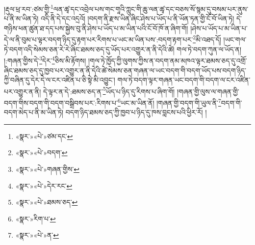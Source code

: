 །རྡུལ་ཕྲ་རབ་:ཙམ་གྱི་\footnote{«སྣར་»«པེ་»ཙམ་དང་}ལན་ཚྭ་དང་འབྲེལ་པས་གང་གཱའི་ཀླུང་གི་ཆུ་ལན་ཚྭ་དང་བཅས་སོ་སྙམ་དུ་བསམ་པར་ནུས་པ་ནི་མ་ཡིན་ཏེ། འདི་ནི་དེ་དང་འདྲའོ། །བདག་ནི་རྫས་ཡིན་ཞིང་ཤེས་པ་ཡོད་པ་ནི་ཡོན་ཏན་གྱི་ངོ་བོ་ཡིན་ཏེ། དེ་གཉིས་ཕན་ཚུན་ཐ་དད་པས་སྐྱེས་བུ་ནི་ཤེས་པ་ཡོད་པ་མ་ཡིན་པའི་ངོ་བོ་ཁོ་ན་ཞིག་གོ། །ཤེས་པ་ཡོད་པ་མ་ཡིན་པ་དེ་ལ་ནི་བུམ་པ་ལྟར་བདག་ཉིད་དུ་རྟག་པར་རིགས་པ་ཡང་མ་ཡིན་པས་:བདག་རྟག་པར་\footnote{«སྣར་»«པེ་»བདག་}མི་འཐད་དོ། །ཡང་གལ་ཏེ་བདག་འདི་སེམས་ཅན་རེ་རེ་ཞིང་ཐམས་ཅད་དུ་ཡོད་པར་འགྱུར་ན་ནི་དེའི་ཚེ། གལ་ཏེ་བདག་ཀུན་ལ་ཡོད་ན། །:གཞན་གྱིས་དེ་\footnote{«སྣར་»«པེ་»གཞན་གྱིས་}དེར་\footnote{«སྣར་»«པེ་»དེར་རང་}ཅིས་མི་རྟོགས། །གལ་ཏེ་ཁྱོད་ཀྱི་ལུགས་ཀྱིས་ན་བདག་ནམ་མཁའ་ལྟར་ཐམས་ཅད་དུ་འགྲོ་ཞིང་ཐམས་ཅད་དུ་ཁྱབ་པར་འགྱུར་ན་ནི་དེའི་ཚེ་སེམས་ཅན་གཞན་ལ་ཡང་བདག་གི་བདག་ཡོད་པས་བདག་ཉིད་ཀྱི་བཞིན་དུ་དེར་དེ་ལ་ངར་འཛིན་པ་ཅི་སྟེ་མི་འབྱུང་། གལ་ཏེ་བདག་ལྟར་གཞན་ཡང་བདག་གི་བདག་ལ་ངར་འཛིན་པར་འགྱུར་ན་ནི། དེ་ལྟར་ན་དེ་:ཐམས་ཅད་ན་\footnote{«སྣར་»«པེ་»ཐམས་ཅད་}ཡོད་པ་ཉིད་དུ་རིགས་པ་ཞིག་གོ། །གཞན་གྱི་ལུས་ལ་གཞན་གྱི་བདག་གིས་བདག་གི་བདག་བསྒྲིབས་པར་:རིགས་པ་\footnote{«སྣར་»རིག་པ་}ཡང་མ་ཡིན་ནོ། །གཞན་གྱི་བདག་གི་ཡུལ་ནི་\footnote{«སྣར་»«པེ་»ན་}བདག་གི་བདག་མེད་པ་ནི་མ་ཡིན་ཏེ། བདག་ཉིད་ཐམས་ཅད་ཀྱི་ཁྱབ་པ་ཉིད་དུ་ཁས་བླངས་པའི་ཕྱིར་རོ། །
